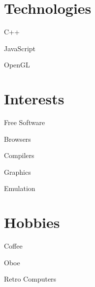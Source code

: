 \documentclass[12pt]{jmichaud-resume}
\begin{document}
	
\begin{minipage}[t]{0.29\textwidth}
\vspace{10pt}

\vspace{22pt}

\section{Technologies}
\vspace{7pt}
\begin{tightemize}
	\item C++
	\item JavaScript
	\item OpenGL
\end{tightemize}

\vspace{15pt}

\section{Interests}
\vspace{7pt}
\begin{tightemize}
	\item Free Software
	\item Browsers
	\item Compilers
	\item Graphics
	\item Emulation
\end{tightemize}

\vspace{20pt}

\section{Hobbies}
\vspace{7pt}
\begin{tightemize}
	\item Coffee
	\item Oboe
	\item Retro Computers
\end{tightemize}


\end{minipage}
\end{document}
